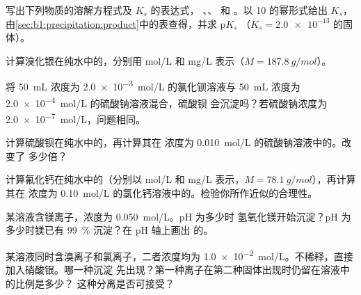 \begin{exercise}[$\star$]\label{exo:b1:precipitation:1}
写出下列物质的溶解方程式及 $K_s$ 的表达式，
、、 和 。以 10 的幂形式给出 $K_s$，
由\cref{sec:b1:precipitation:product}中的表查得，并求 $\mathrm{p}K_s$
（$K_s = \num{2.0e-13}$ 的固体）。
\end{exercise}

\begin{exercise}[$\star$]\label{exo:b1:precipitation:2}
计算溴化银在纯水中的，分别用 \unit{mol/L}
和 \unit{mg/L} 表示（$M = \qty{187.8}{g/mol}$）。
\end{exercise}

\begin{exercise}[$\star$]\label{exo:b1:precipitation:3}
将 \qty{50}{mL} 浓度为 \qty{2.0e-3}{mol/L} 的氯化钡溶液与
\qty{50}{mL} 浓度为 \qty{2.0e-4}{mol/L} 的硫酸钠溶液混合，硫酸钡
会沉淀吗？若硫酸钠浓度为
\qty{2.0e-7}{mol/L}，问题相同。
\end{exercise}

\begin{exercise}[$\star$]\label{exo:b1:precipitation:4}
计算硫酸钡在纯水中的，再计算其在
浓度为 \qty{0.010}{mol/L} 的硫酸钠溶液中的。改变了
多少倍？
\end{exercise}

\begin{exercise}[$\star\star$]\label{exo:b1:precipitation:5}
计算氟化钙在纯水中的（分别以 \unit{mol/L} 和
\unit{mg/L} 表示，$M = \qty{78.1}{g/mol}$），再计算其在
浓度为 \qty{0.10}{mol/L} 的氯化钙溶液中的。检验你所作近似的合理性。
\end{exercise}

\begin{exercise}[$\star\star$]\label{exo:b1:precipitation:6}
某溶液含镁离子，浓度为 \qty{0.050}{mol/L}。pH 为多少时
氢氧化镁开始沉淀？pH 为多少时镁已有
\qty{99}{\percent} 沉淀？在 pH 轴上画出 
的。
\end{exercise}

\begin{exercise}[$\star\star$]\label{exo:b1:precipitation:7}
某溶液同时含溴离子和氯离子，二者浓度均为
\qty{1.0e-2}{mol/L}。不稀释，直接加入硝酸银。哪一种沉淀
先出现？第一种离子在第二种固体出现时仍留在溶液中的比例是多少？
这种分离是否可接受？
\end{exercise}

